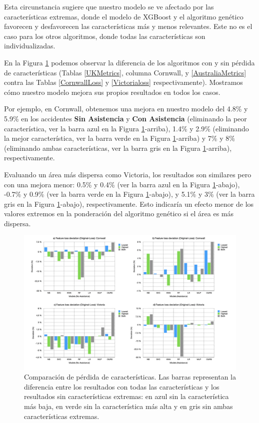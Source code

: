 \documentclass{uathesis-es}
\begin{document}
{Esta circunstancia sugiere que nuestro modelo se ve afectado por las características extremas, donde el modelo de XGBoost y el algoritmo genético favorecen y desfavorecen las características más y menos relevantes. Este no es el caso para los otros algoritmos, donde todas las características son individualizadas.

En la Figura \ref{lossFig} podemos observar la diferencia de los algoritmos con y sin pérdida de características (Tablas \ref{UKMetrics}, columna Cornwall, y \ref{AustraliaMetrics} contra las Tablas \ref{CornwallLoss} y \ref{Victorialoss} respectivamente). Mostramos cómo nuestro modelo mejora sus propios resultados en todos los casos.

Por ejemplo, en Cornwall, obtenemos una mejora en nuestro modelo del 4.8\% y 5.9\% en los accidentes \textbf{Sin Asistencia} y \textbf{Con Asistencia} (eliminando la peor característica, ver la barra azul en la Figura \ref{lossFig}-arriba), 1.4\% y 2.9\% (eliminando la mejor característica, ver la barra verde en la Figura \ref{lossFig}-arriba) y 7\% y 8\% (eliminando ambas características, ver la barra gris en la Figura \ref{lossFig}-arriba), respectivamente.

Evaluando un área más dispersa como Victoria, los resultados son similares pero con una mejora menor: 0.5\% y 0.4\% (ver la barra azul en la Figura \ref{lossFig}-abajo), -0.7\% y 0.9\% (ver la barra verde en la Figura \ref{lossFig}-abajo), y 5.1\% y 3\% (ver la barra gris en la Figura \ref{lossFig}-abajo), respectivamente. Esto indicaría un efecto menor de los valores extremos en la ponderación del algoritmo genético si el área es más dispersa.

\begin{figure}[H]
    \centering
    \includegraphics[width=180mm]{Figures/LossFeatures/loss.png}
    \caption{Comparación de pérdida de características. Las barras representan la diferencia entre los resultados con todas las características y los resultados sin características extremas: en azul sin la característica más baja, en verde sin la característica más alta y en gris sin ambas características extremas.}
    \label{lossFig}
\end{figure}


}
\end{document}
